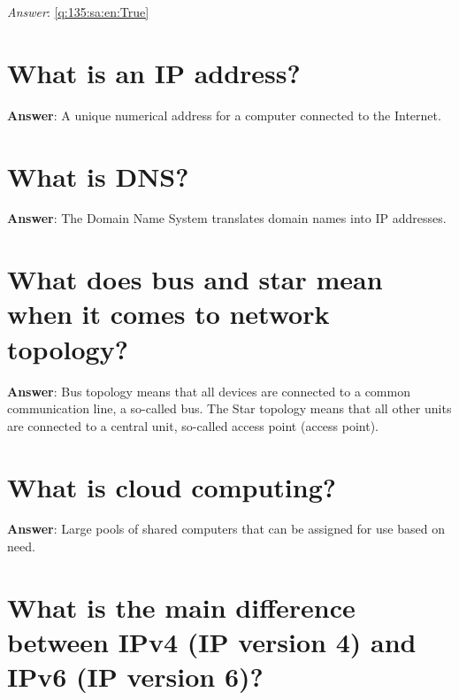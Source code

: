 \documentclass[a4paper,11pt,oneside]{book}
\begin{document}
\begin{sloppypar}
\label{q:135:sa:en:True}

\vspace{2cm}

\noindent\makebox[\textwidth]{\hrulefill}

\vspace{1cm}

\textit{Answer}: \autoref{q:135:sa:en:True}



\section{What is an IP address?}

\label{q:136:sa:en:True}

\textbf{Answer}: A unique numerical address for a computer connected to the Internet.



\section{What is DNS?}

\label{q:137:sa:en:True}

\textbf{Answer}: The Domain Name System translates domain names into IP addresses.



\section{What does bus and star mean when it comes to network topology?}

\label{q:138:sa:en:True}

\textbf{Answer}: Bus topology means that all devices are connected to a common communication line, a so-called bus. The Star topology means that all other units are connected to a central unit, so-called access point (access point).



\section{What is cloud computing?}

\label{q:139:sa:en:True}

\textbf{Answer}: Large pools of shared computers that can be assigned for use based on need.



\section{What is the main difference between IPv4 (IP version 4) and IPv6 (IP version 6)?}


\end{sloppypar}
\end{document}
